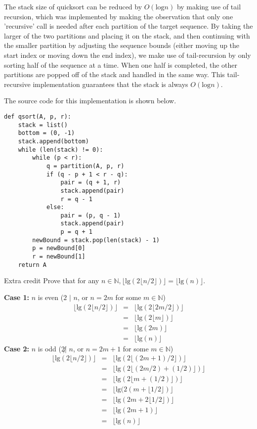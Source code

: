 \documentclass[11pt]{article}
\newcommand{\tlg}{\text{lg}}
\newcommand{\tlog}{\text{log}}
\begin{document}
\begin{prob}{3}
\end{prob}
\begin{sol}
The stack size of quicksort can be reduced by $O(\tlog n)$ by making use of tail recursion, which was implemented by making the observation that only one 'recursive' call is needed after each partition of the target sequence. By taking the larger of the two partitions and placing it on the stack, and then continuing with the smaller partition by adjusting the sequence bounds (either moving up the start index or moving down the end index), we make use of tail-recursion by only sorting half of the sequence at a time. When one half is completed, the other partitions are popped off of the stack and handled in the same way. This tail-recursive implementation guarantees that the stack is always $O(\tlog n)$.

The source code for this implementation is shown below.
\begin{lstlisting}
def qsort(A, p, r):
	stack = list()
	bottom = (0, -1)
	stack.append(bottom)
	while (len(stack) != 0):
		while (p < r):
			q = partition(A, p, r)
			if (q - p + 1 < r - q):
				pair = (q + 1, r)
				stack.append(pair)
				r = q - 1
			else:
				pair = (p, q - 1)
				stack.append(pair)
				p = q + 1
		newBound = stack.pop(len(stack) - 1)
		p = newBound[0]
		r = newBound[1]
	return A
\end{lstlisting}
\end{sol}

\begin{prob}{Extra credit}
Prove that for any $n \in \mathbb{N}, \lfloor\tlg(2\lfloor n/2 \rfloor) \rfloor = \lfloor \tlg (n) \rfloor$.
\end{prob}
\begin{sol}

\textbf{Case 1:} $n$ is even ($2$ $|$ $n$, or $n = 2m$ for some $m \in \mathbb{N}$)
\begin{eqnarray*}
\lfloor \tlg (2\lfloor n/2 \rfloor) \rfloor & = & \lfloor \tlg (2\lfloor 2m/2 \rfloor) \rfloor \\
& = & \lfloor \tlg (2\lfloor m \rfloor) \rfloor \\
& = & \lfloor \tlg (2m) \rfloor \\
& = & \lfloor \tlg (n) \rfloor
\end{eqnarray*}
\textbf{Case 2:} $n$ is odd ($2 \not| $  $n$, or $n = 2m + 1$ for some $m \in \mathbb{N}$)
\begin{eqnarray*}
\lfloor \tlg (2\lfloor n/2 \rfloor) \rfloor & = & \lfloor \tlg (2\lfloor (2m + 1)/2 \rfloor) \rfloor \\
& = & \lfloor \tlg (2\lfloor (2m/2) + (1/2) \rfloor) \rfloor \\
& = & \lfloor \tlg (2\lfloor m + (1/2) \rfloor) \rfloor \\
& = & \lfloor \tlg (2(m + \lfloor 1/2 \rfloor) \rfloor \\
& = & \lfloor \tlg (2m + 2\lfloor 1/2 \rfloor ) \rfloor \\
& = & \lfloor \tlg (2m + 1) \rfloor \\
& = & \lfloor \tlg (n) \rfloor
\end{eqnarray*}
\end{sol}
\end{document}

